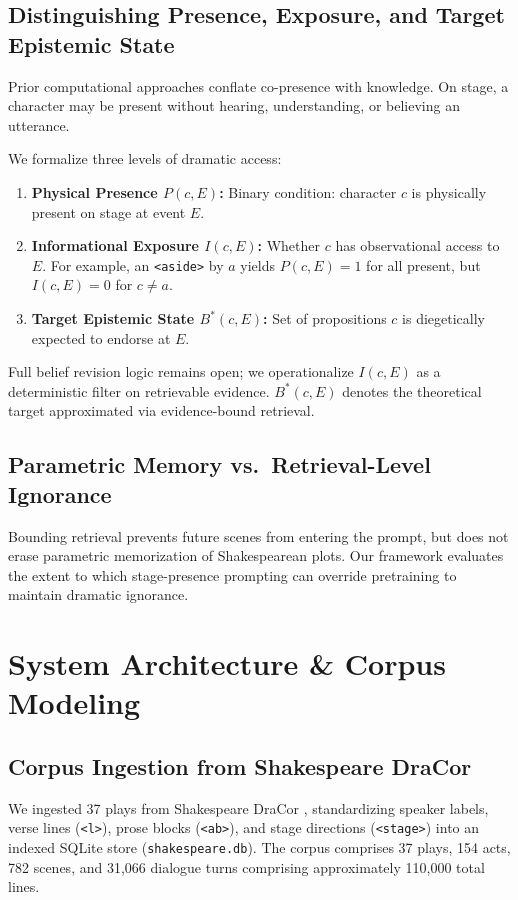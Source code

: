 \documentclass[sn-basic, referee]{sn-jnl}
\begin{document}
\subsection{Distinguishing Presence, Exposure, and Target Epistemic State}\label{sec2.2}
Prior computational approaches conflate co-presence with knowledge. On stage, a character may be present without hearing, understanding, or believing an utterance.

We formalize three levels of dramatic access:
\begin{enumerate}
    \item \textbf{Physical Presence $P(c, E)$:} Binary condition: character $c$ is physically present on stage at event $E$.
    \item \textbf{Informational Exposure $I(c, E)$:} Whether $c$ has observational access to $E$. For example, an \texttt{<aside>} by $a$ yields $P(c, E)=1$ for all present, but $I(c, E)=0$ for $c \ne a$.
    \item \textbf{Target Epistemic State $B^*(c, E)$:} Set of propositions $c$ is diegetically expected to endorse at $E$.
\end{enumerate}
Full belief revision logic remains open; we operationalize $I(c, E)$ as a deterministic filter on retrievable evidence. $B^*(c, E)$ denotes the theoretical target approximated via evidence-bound retrieval.

\subsection{Parametric Memory vs.\ Retrieval-Level Ignorance}
Bounding retrieval prevents future scenes from entering the prompt, but does not erase parametric memorization of Shakespearean plots. Our framework evaluates the extent to which stage-presence prompting can override pretraining to maintain dramatic ignorance.

\section{System Architecture \& Corpus Modeling}\label{sec3}

\subsection{Corpus Ingestion from Shakespeare DraCor}
We ingested 37 plays from Shakespeare DraCor \citep{fischer2019programmable}, standardizing speaker labels, verse lines (\texttt{<l>}), prose blocks (\texttt{<ab>}), and stage directions (\texttt{<stage>}) into an indexed SQLite store (\texttt{shakespeare.db}). The corpus comprises 37 plays, 154 acts, 782 scenes, and 31,066 dialogue turns comprising approximately 110,000 total lines.
\end{document}
